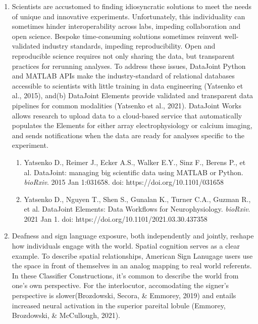 \documentclass{nihbiosketch}
\begin{document}
\begin{enumerate}
\item Scientists are accustomed to finding idiosyncratic solutions to meet the needs of
 unique and innovative experiments. Unfortunately, this individuality can sometimes
 hinder interoperability across labs, impeding collaboration and open science. Bespoke
 time-consuming solutions sometimes reinvent well-validated industry standards,
 impeding reproducibility. Open and reproducible science requires not only sharing the
 data, but transparent practices for rerunning analyses. To address these issues,
 DataJoint Python and MATLAB APIs make the industry-standard of relational databases
 accessible to scientists with little training in data engineering (Yatsenko et al.,
 2015), and(b) DataJoint Elements provide validated and transparent data pipelines for
 common modalities (Yatsenko et al., 2021). DataJoint Works allows research to upload
 data to a cloud-based service that automatically populates the Elements for either
 array electrophysiology or calcium imaging, and sends notifications when the data are
 ready for analyses specific to the experiment.

\begin{enumerate}

\item Yatsenko D., Reimer J., Ecker A.S., Walker E.Y., Sinz F., Berens P., et al.
        DataJoint: managing big scientific data using MATLAB or Python.
        \textit{bioRxiv}. 2015 Jan 1:031658. doi: https://doi.org/10.1101/031658

\item Yatsenko D., Nguyen T., Shen S., Gunalan K., Turner C.A., Guzman R., et al.
        DataJoint Elements: Data Workflows for Neurophysiology. \textit{bioRxiv}.
        2021 Jan 1. doi: https://doi.org/10.1101/2021.03.30.437358

\end{enumerate}
\item Deafness and sign language exposure, both independently and jointly, reshape how
 individuals engage with the world. Spatial cognition serves as a clear example. To
 describe spatial relationships, American Sign Lanugage users use the space in front of
 themselves in an analog mapping to real world referents. In these Classifier
 Constructions, it's common to describe the world from one's own perspective. For the
 interlocutor, accomodating the signer's perspective is slower(Brozdowski, Secora, \&
 Emmorey, 2019) and entails increased neural activation in the superior pareital
 lobule (Emmorey, Brozdowski, \& McCullough, 2021).


\end{enumerate}
\end{document}
